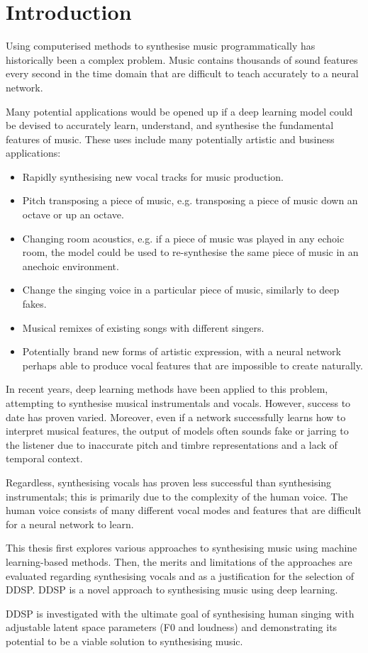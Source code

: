 \chapter{Introduction}
\label{ch:introduction}

Using computerised methods to synthesise music programmatically has historically been a complex problem. Music contains thousands of sound features every second in the time domain that are difficult to teach accurately to a neural network.

Many potential applications would be opened up if a deep learning model could be devised to accurately learn, understand, and synthesise the fundamental features of music. These uses include many potentially artistic and business applications:

\begin{itemize}
    \item Rapidly synthesising new vocal tracks for music production.
    \item Pitch transposing a piece of music, e.g. transposing a piece of music down an octave or up an octave.
    \item Changing room acoustics, e.g. if a piece of music was played in any echoic room, the model could be used to re-synthesise the same piece of music in an anechoic environment.
    \item Change the singing voice in a particular piece of music, similarly to deep fakes.
    \item Musical remixes of existing songs with different singers.
    \item Potentially brand new forms of artistic expression, with a neural network perhaps able to produce vocal features that are impossible to create naturally.
\end{itemize}

In recent years, deep learning methods have been applied to this problem, attempting to synthesise musical instrumentals and vocals. However, success to date has proven varied. Moreover, even if a network successfully learns how to interpret musical features, the output of models often sounds fake or jarring to the listener due to inaccurate pitch and timbre representations and a lack of temporal context.

Regardless, synthesising vocals has proven less successful than synthesising instrumentals; this is primarily due to the complexity of the human voice. The human voice consists of many different vocal modes and features that are difficult for a neural network to learn.

This thesis first explores various approaches to synthesising music using machine learning-based methods. Then, the merits and limitations of the approaches are evaluated regarding synthesising vocals and as a justification for the selection of DDSP. DDSP is a novel approach to synthesising music using deep learning.

DDSP is investigated with the ultimate goal of synthesising human singing with adjustable latent space parameters (F0 and loudness) and demonstrating its potential to be a viable solution to synthesising music.



